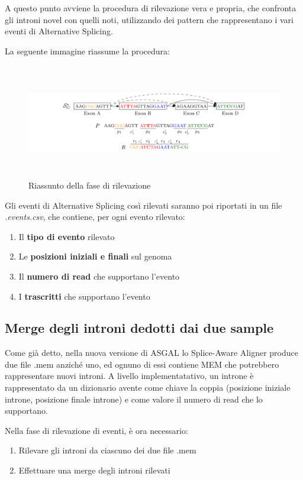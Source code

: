 A questo punto avviene la procedura di rilevazione vera e propria, che confronta gli introni novel con quelli noti, utilizzando dei pattern che rappresentano i vari eventi di Alternative Splicing.

La seguente immagine riassume la procedura:

\begin{figure}[h!]
	\centering
	\includegraphics[width=\linewidth, height=5cm]{images/riassuntorilevazione.png}
  \caption{Riassunto della fase di rilevazione}
  \label{fig:Summary2}
\end{figure}

\newpage

Gli eventi di Alternative Splicing così rilevati saranno poi riportati in un file \textit{.events.csv}, che contiene, per ogni evento rilevato:
\begin{enumerate}
	\item Il \textbf{tipo di evento} rilevato
	\item Le \textbf{posizioni iniziali e finali} sul genoma
	\item Il \textbf{numero di read} che supportano l'evento
	\item I \textbf{trascritti} che supportano l'evento
\end{enumerate}

\subsection{Merge degli introni dedotti dai due sample}

Come già detto, nella nuova versione di ASGAL lo Splice-Aware Aligner produce due file .mem anziché uno, ed ognuno di essi contiene MEM che potrebbero rappresentare nuovi introni. A livello implementatativo, un introne è rappresentato da un dizionario avente come chiave la coppia (posizione iniziale introne, posizione finale introne) e come valore il numero di read che lo supportano.

Nella fase di rilevazione di eventi, è ora necessario:
\begin{enumerate}
	\item Rilevare gli introni da ciascuno dei due file .mem
	\item Effettuare una merge degli introni rilevati
\end{enumerate}

